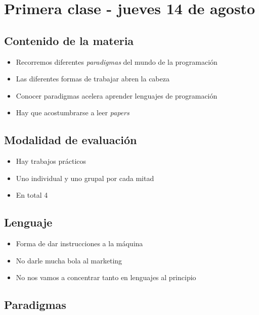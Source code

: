 \section{Primera clase - jueves 14 de agosto}

\subsection{Contenido de la materia}

\begin{itemize}
    \item Recorremos diferentes \textit{paradigmas} del mundo de la programación
    \item Las diferentes formas de trabajar abren la cabeza
    \item Conocer paradigmas acelera aprender lenguajes de programación
    \item Hay que acostumbrarse a leer \textit{papers}
\end{itemize}

\subsection{Modalidad de evaluación}

\begin{itemize}
    \item Hay trabajos prácticos
    \item Uno individual y uno grupal por cada mitad
    \item En total 4
\end{itemize}

\subsection{Lenguaje}

\begin{itemize}
    \item Forma de dar instrucciones a la máquina
    \item No darle mucha bola al marketing
    \item No nos vamos a concentrar tanto en lenguajes al principio
\end{itemize}

\subsection{Paradigmas}

